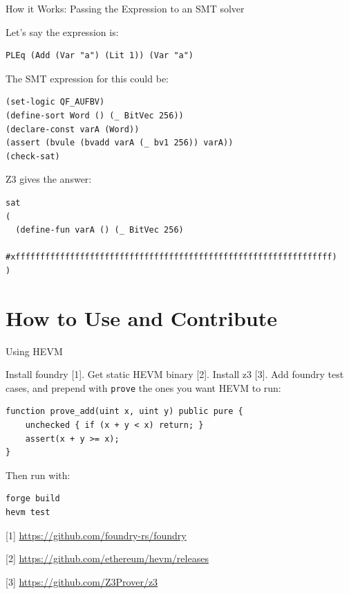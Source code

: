 \documentclass{beamer}
\begin{document}
\begin{frame}[fragile=singleslide]{How it Works: Passing the Expression to an SMT solver}

Let's say the expression is:

\begin{Verbatim}[frame=single, framerule=0.2mm, framesep=2mm,fontsize=\footnotesize]
PLEq (Add (Var "a") (Lit 1)) (Var "a")
\end{Verbatim}
\bigskip

The SMT expression for this could be:

\begin{Verbatim}[frame=single, framerule=0.2mm, framesep=2mm,fontsize=\footnotesize]
(set-logic QF_AUFBV)
(define-sort Word () (_ BitVec 256))
(declare-const varA (Word))
(assert (bvule (bvadd varA (_ bv1 256)) varA))
(check-sat)
\end{Verbatim}

Z3 gives the answer:

\begin{Verbatim}[frame=single, framerule=0.2mm, framesep=2mm,fontsize=\footnotesize]
sat
(
  (define-fun varA () (_ BitVec 256)
    #xffffffffffffffffffffffffffffffffffffffffffffffffffffffffffffffff)
)
\end{Verbatim}
\end{frame}

\section{How to Use and Contribute}
\begin{frame}[fragile=singleslide]{Using HEVM}

Install foundry [1]. Get static HEVM binary [2]. Install z3 [3]. Add foundry test cases, and prepend with \texttt{prove} the ones you want HEVM to run:

\begin{Verbatim}[frame=single, framerule=0.2mm, framesep=2mm,fontsize=\footnotesize]
function prove_add(uint x, uint y) public pure {
    unchecked { if (x + y < x) return; }
    assert(x + y >= x);
}
\end{Verbatim}

Then run with:

\begin{Verbatim}[frame=single, framerule=0.2mm, framesep=2mm,fontsize=\footnotesize]
forge build
hevm test
\end{Verbatim}


\bigskip

[1] \url{https://github.com/foundry-rs/foundry}

[2] \url{https://github.com/ethereum/hevm/releases}

[3] \url{https://github.com/Z3Prover/z3}
\end{frame}
\end{document}
